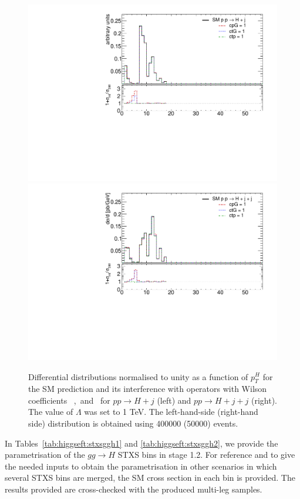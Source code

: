 \begin{figure}
\includegraphics[width=0.49\linewidth,page=5]{figures/kinematics_gghj_more.pdf}
\includegraphics[width=0.49\linewidth,page=5]{figures/kinematics_gghjj.pdf}

\caption{Differential distributions normalised to unity as a function of $p_{T}^{H}$ for the SM prediction and its interference with operators with Wilson coefficients \cpG\ ,\ctG\ and \ctp\ for $p p \to H + j$ (left) and $p p \to H + j + j$ (right). The value of $\Lambda$ was set to 1 TeV. The left-hand-side (right-hand side) distribution is obtained using 400000 (50000) events.}
\label{fig:higgseft:ggh}

\end{figure}
  
  

 In Tables~\ref{tab:higgseft:stxsggh1} and \ref{tab:higgseft:stxsggh2}, we provide the parametrisation of the $gg\to H$ STXS bins in stage 1.2. For reference and to give the needed inputs to obtain the parametrisation in other scenarios in which several STXS bins are merged, the SM cross section in each bin is provided. The results provided are cross-checked with the produced multi-leg samples. 

 
 
